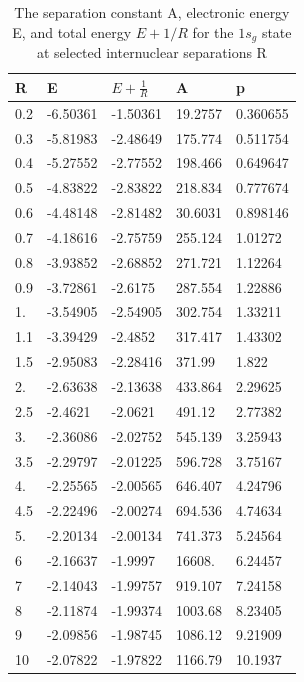     \begin{table}[h!]
  \caption{The separation constant A, electronic energy E, and total energy $E+1/R$ for the $1s_g$ state at selected internuclear separations R}
  \centering
  \label{1sg}
		\begin{tabular}{ m{6em} m{6em}  m{6em}  m{6em} m{6em} }
			\hline
			R & E & $ E + \frac{1}{R} $ & A & p \\ \hline \hline
 0.2 & -6.50361 & -1.50361 & 19.2757 & 0.360655\\
 0.3 & -5.81983 & -2.48649 & 175.774 & 0.511754\\
 0.4 & -5.27552 & -2.77552 & 198.466 & 0.649647\\
 0.5 & -4.83822 & -2.83822 & 218.834 & 0.777674\\
 0.6 & -4.48148 & -2.81482 & 30.6031 & 0.898146\\
 0.7 & -4.18616 & -2.75759 & 255.124 & 1.01272\\
 0.8 & -3.93852 & -2.68852 & 271.721 & 1.12264\\
 0.9 & -3.72861 & -2.6175 & 287.554 & 1.22886\\
 1. & -3.54905 & -2.54905 & 302.754 & 1.33211\\
 1.1 & -3.39429 & -2.4852 & 317.417 & 1.43302\\
 1.5 & -2.95083 & -2.28416 & 371.99 & 1.822\\
 2. & -2.63638 & -2.13638 & 433.864 & 2.29625\\
 2.5 & -2.4621 & -2.0621 & 491.12 & 2.77382\\
 3. & -2.36086 & -2.02752 & 545.139 & 3.25943\\
 3.5 & -2.29797 & -2.01225 & 596.728 & 3.75167\\
 4. & -2.25565 & -2.00565 & 646.407 & 4.24796\\
 4.5 & -2.22496 & -2.00274 & 694.536 & 4.74634\\
 5. & -2.20134 & -2.00134 & 741.373 & 5.24564\\
 6 & -2.16637 & -1.9997 & 16608. & 6.24457\\
 7 & -2.14043 & -1.99757 & 919.107 & 7.24158\\
 8 & -2.11874 & -1.99374 & 1003.68 & 8.23405\\
 9 & -2.09856 & -1.98745 & 1086.12 & 9.21909\\
 10 & -2.07822 & -1.97822 & 1166.79 & 10.1937 \\
          \hline
		\end{tabular}
    \end{table}

